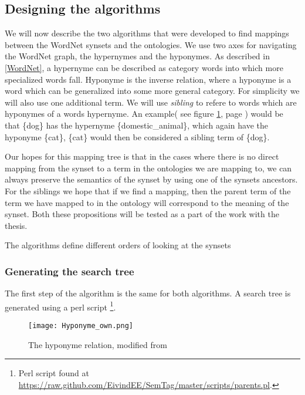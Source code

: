 \subsection{Designing the algorithms}
We will now describe the two algorithms that were developed to find mappings between the WordNet synsets and the ontologies.
We use two axes for navigating the WordNet graph, the hypernymes and the hyponymes.
As described in \ref{WordNet}, a hypernyme can be described as category words into which more specialized words fall.
Hyponyme is the inverse relation, where a hyponyme is a word which can be generalized into some more general category.
For simplicity we will also use one additional term.
We will use \emph{sibling} to refere to words which are hyponymes of a words hypernyme.
An example( see figure \ref{Hyponyme}, page \pageref{Hyponyme})
would be that \{dog\} has the hypernyme \{domestic\_animal\}, which again have the hyponyme \{cat\},
\{cat\} would then be considered a sibling term of \{dog\}.


Our hopes for this mapping tree is that in the cases where there is no direct mapping from the synset to a term in the
ontologies we are mapping to, we can always preserve the semantics of the synset by using one of the synsets ancestors.
For the siblings we hope that if we find a mapping,
then the parent term of the term we have mapped to in the ontology will correspond to the meaning of the synset.
Both these propositions will be tested as a part of the work with the thesis.

The algorithms define different orders of looking at the synsets

\subsubsection{Generating the search tree}
The first step of the algorithm is the same for both algorithms.
A search tree is generated using a perl script
\footnote{Perl script found at \url{https://raw.github.com/EivindEE/SemTag/master/scripts/parents.pl}.}.

\begin{figure}[h]
	\begin{center}
		\texttt{[image: Hyponyme\_own.png]}
		\caption{The hyponyme relation, modified from \protect \citet{Miller1990}}
		\label{Hyponyme}
	\end{center}
\end{figure}



